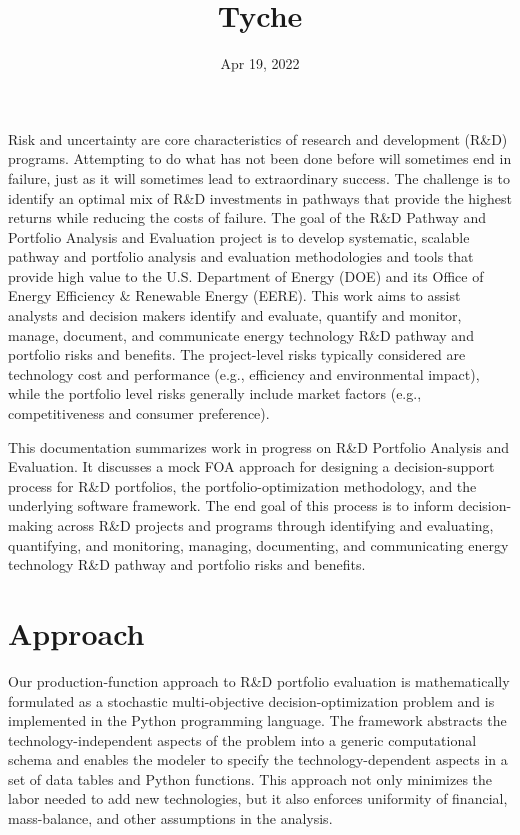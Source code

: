 \documentclass[letterpaper,10pt,english]{sphinxmanual}
\title{Tyche}
\date{Apr 19, 2022}
\author{}
\begin{document}
\pagestyle{empty}
\sphinxmaketitle
\pagestyle{plain}
\sphinxtableofcontents
\pagestyle{normal}
\label{\detokenize{main_page::doc}}


Risk and uncertainty are core characteristics of research and development (R\&D) programs. Attempting to do what has not been done before will sometimes end in failure, just as it will sometimes lead to extraordinary success. The challenge is to identify an optimal mix of R\&D investments in pathways that provide the highest returns while reducing the costs of failure. The goal of the R\&D Pathway and Portfolio Analysis and Evaluation project is to develop systematic, scalable pathway and portfolio analysis and evaluation methodologies and tools that provide high value to the U.S. Department of Energy (DOE) and its Office of Energy Efficiency \& Renewable Energy (EERE). This work aims to assist analysts and decision makers identify and evaluate, quantify and monitor, manage, document, and communicate energy technology R\&D pathway and portfolio risks and benefits. The project-level risks typically considered are technology cost and performance (e.g., efficiency and environmental impact), while the portfolio level risks generally include market factors (e.g., competitiveness and consumer preference).

This documentation summarizes work in progress on R\&D Portfolio Analysis and Evaluation. It discusses a mock FOA approach for designing a decision-support process for R\&D portfolios, the portfolio-optimization methodology, and the underlying software framework. The end goal of this process is to inform decision-making across R\&D projects and programs through identifying and evaluating, quantifying, and monitoring, managing, documenting, and communicating energy technology R\&D pathway and portfolio risks and benefits.


\chapter{Approach}
\label{\detokenize{doc-src/approach:approach}}\label{\detokenize{doc-src/approach::doc}}
Our production-function approach to R\&D portfolio evaluation is
mathematically formulated as a stochastic multi-objective
decision-optimization problem and is implemented in the Python
programming language. The framework abstracts the technology-independent
aspects of the problem into a generic computational schema and enables
the modeler to specify the technology-dependent aspects in a set of data
tables and Python functions. This approach not only minimizes the labor
needed to add new technologies, but it also enforces uniformity of
financial, mass-balance, and other assumptions in the analysis.
\end{document}
